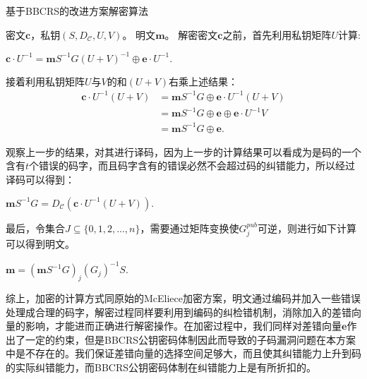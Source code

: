 \begin{breakablealgorithm}
	\small
	\renewcommand{\algorithmicrequire}{\textbf{Input:}}
	\renewcommand{\algorithmicensure}{\textbf{Output:}}
	\caption{基于BBCRS的改进方案解密算法}
	\label{alg:NewDe}
	\begin{algorithmic}[1]
		\Require
		密文$\mathbf{c}$，私钥$(S,D_\mathcal{C},U,V)$。
		\Ensure
		明文$\mathbf{m}$。
		\State
		解密密文$\mathbf{c}$之前，首先利用私钥矩阵$U$计算:
		\begin{center}
			$\textbf{c}\cdot U^{-1} = \textbf{m}S^{-1}G(U+V)^{-1} \oplus\textbf{e}\cdot U^{-1}.$
		\end{center}
		\State
		接着利用私钥矩阵$U$与$V$的和$(U + V)$右乘上述结果：
		\begin{equation}
			\begin{aligned}
				\textbf{c}\cdot U^{-1}(U+V) &= \textbf{m}S^{-1}G \oplus\textbf{e}\cdot U^{-1}(U+V) \\
				& = \textbf{m}S^{-1}G \oplus  \textbf{e} \oplus \textbf{e}\cdot U^{-1}V \\
				& = \textbf{m}S^{-1}G \oplus  \textbf{e}.
			\end{aligned}
		\end{equation}
		
		\State
		观察上一步的结果，对其进行译码，因为上一步的计算结果可以看成为是码的一个含有$t$个错误的码字，而且码字含有的错误必然不会超过码的纠错能力，所以经过译码可以得到：
		\begin{center}
			$\mathbf{m}S^{-1}G = D_\mathcal{C}(\textbf{c}\cdot U^{-1}(U+V)).$
		\end{center}
		
		\State
		最后，令集合$J \subseteq \{0,1,2,...,n\}$，需要通过矩阵变换使$G_j^{pub}$可逆，则进行如下计算可以得到明文。
		\begin{center}
			$\mathbf{m} = (\mathbf{m}S^{-1}G)_j(G_j)^{-1}S.$
		\end{center}		
	\end{algorithmic}
\end{breakablealgorithm}

综上，加密的计算方式同原始的McEliece加密方案，明文通过编码并加入一些错误处理成合理的码字，解密过程同样要利用到编码的纠检错机制，消除加入的差错向量的影响，才能进而正确进行解密操作。在加密过程中，我们同样对差错向量$\mathbf{e}$作出了一定的约束，但是BBCRS公钥密码体制因此而导致的子码漏洞问题在本方案中是不存在的。我们保证差错向量的选择空间足够大，而且使其纠错能力上升到码的实际纠错能力，而BBCRS公钥密码体制在纠错能力上是有所折扣的。

